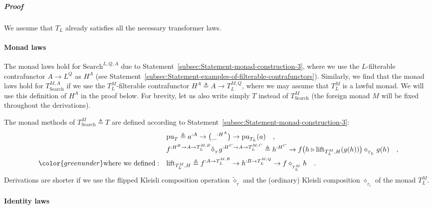\subparagraph{Proof}

We assume that $T_{L}$ already satisfies all the necessary transformer
laws.

\paragraph{Monad laws}

The monad laws hold for $\text{Search}^{L,Q,A}$ due to Statement~\ref{subsec:Statement-monad-construction-3},
where we use the $L$-filterable contrafunctor $A\rightarrow L^{Q}$
as $H^{A}$ (see Statement~\ref{subsec:Statement-examples-of-filterable-contrafunctors}).
Similarly, we find that the monad laws hold for $T_{\text{Search}}^{M,A}$
if we use the $T_{L}^{M}$-filterable contrafunctor $H^{A}\triangleq A\rightarrow T_{L}^{M,Q}$,
where we may assume that $T_{L}^{M}$ is a lawful monad. We will use
this definition of $H^{A}$ in the proof below. For brevity, let us
also write simply $T$ instead of $T_{\text{Search}}^{M}$ (the foreign
monad $M$ will be fixed throughout the derivations). 

The monad methods of $T_{\text{Search}}^{M}\triangleq T$ are defined
according to Statement~\ref{subsec:Statement-monad-construction-3}:
\begin{align*}
 & \text{pu}_{T}\triangleq a^{:A}\rightarrow\big(\_^{:H^{A}}\big)\rightarrow\text{pu}_{T_{L}}(a)\quad,\\
 & f^{:H^{B}\rightarrow A\rightarrow T_{L}^{M,B}}\tilde{\diamond}_{_{T}}g^{:H^{C}\rightarrow A\rightarrow T_{L}^{M,C}}\triangleq h^{:H^{C}}\rightarrow f\big(h\triangleright\text{lift}_{T_{L}^{M},H}(g(h))\big)\diamond_{_{T_{L}}}g(h)\quad,\\
{\color{greenunder}\text{where we defined}:}\quad & \text{lift}_{T_{L}^{M},H}\triangleq f^{:A\rightarrow T_{L}^{M,B}}\rightarrow h^{:B\rightarrow T_{L}^{M,Q}}\rightarrow f\diamond_{_{T_{L}^{M}}}h\quad.
\end{align*}
Derivations are shorter if we use the flipped Kleisli composition
operation $\tilde{\diamond}_{_{T}}$ and the (ordinary) Kleisli composition
$\diamond_{_{T_{L}}}$ of the monad $T_{L}^{M}$.

\paragraph{Identity laws}

